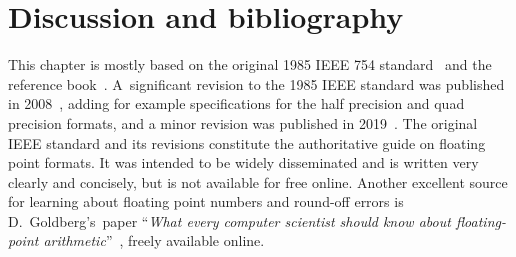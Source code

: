 \section{Discussion and bibliography}%
\label{sec:discussion_and_bibliograhpy}
This chapter is mostly based on the original 1985 IEEE 754 standard~\cite{ieee754} and the reference book~\cite{MR2265914}.
A~significant revision to the 1985 IEEE standard was published in 2008~\cite{ieee2008},
adding for example specifications for the half precision and quad precision formats,
and a minor revision was published in 2019~\cite{ieee2019}.
The original IEEE standard and its revisions constitute the authoritative guide on floating point formats.
It was intended to be widely disseminated and is written very clearly and concisely,
but is not available for free online.
Another excellent source for learning about floating point numbers and round-off errors is D.\ Goldberg's~paper ``\emph{What every computer scientist should know about floating-point arithmetic}''~\cite{goldberg1991every},
freely available online.

